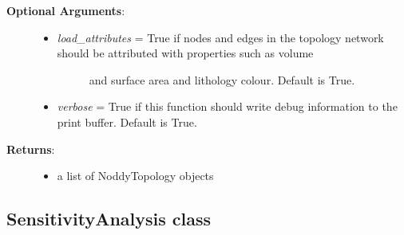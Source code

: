 \documentclass[a4paper,10pt,english]{sphinxmanual}
\begin{document}
\begin{fulllineitems}
\begin{fulllineitems}
\begin{description}
\begin{itemize}
\begin{description}
\end{description}

\end{itemize}

\item[{\textbf{Optional Arguments}:}] \leavevmode\begin{itemize}
\item {} \begin{description}
\item[{\emph{load\_attributes} = True if nodes and edges in the topology network should be attributed with properties such as volume}] \leavevmode
and surface area and lithology colour. Default is True.

\end{description}

\item {} 
\emph{verbose} = True if this function should write debug information to the print buffer. Default is True.

\end{itemize}

\item[{\textbf{Returns}:}] \leavevmode\begin{itemize}
\item {} 
a list of NoddyTopology objects

\end{itemize}

\end{description}

\end{fulllineitems}


\end{fulllineitems}



\subsection{SensitivityAnalysis class}
\label{pynoddy:sensitivityanalysis-class}\label{pynoddy:module-pynoddy.experiment.SensitivityAnalysis}
\end{document}
